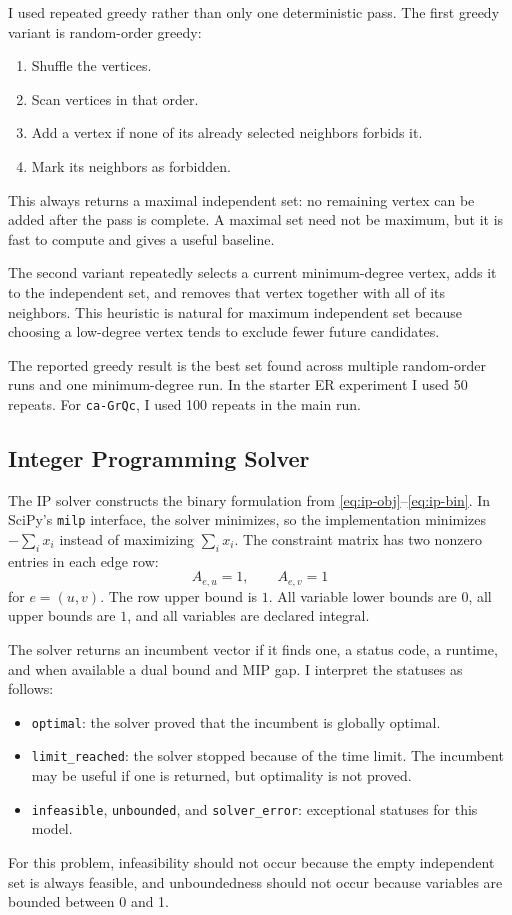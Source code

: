 \documentclass[11pt]{article}
\begin{document}
I used repeated greedy rather than only one deterministic pass. The first greedy
variant is random-order greedy:
\begin{enumerate}[leftmargin=*]
  \item Shuffle the vertices.
  \item Scan vertices in that order.
  \item Add a vertex if none of its already selected neighbors forbids it.
  \item Mark its neighbors as forbidden.
\end{enumerate}
This always returns a maximal independent set: no remaining vertex can be added
after the pass is complete. A maximal set need not be maximum, but it is fast to
compute and gives a useful baseline.

The second variant repeatedly selects a current minimum-degree vertex, adds it
to the independent set, and removes that vertex together with all of its
neighbors. This heuristic is natural for maximum independent set because choosing
a low-degree vertex tends to exclude fewer future candidates.

The reported greedy result is the best set found across multiple random-order
runs and one minimum-degree run. In the starter ER experiment I used 50 repeats.
For \texttt{ca-GrQc}, I used 100 repeats in the main run.

\subsection{Integer Programming Solver}

The IP solver constructs the binary formulation from
\eqref{eq:ip-obj}--\eqref{eq:ip-bin}. In SciPy's \texttt{milp} interface, the
solver minimizes, so the implementation minimizes $-\sum_i x_i$ instead of
maximizing $\sum_i x_i$. The constraint matrix has two nonzero entries in each
edge row:
\[
  A_{e,u}=1,\qquad A_{e,v}=1
\]
for $e=(u,v)$. The row upper bound is $1$. All variable lower bounds are $0$,
all upper bounds are $1$, and all variables are declared integral.

The solver returns an incumbent vector if it finds one, a status code, a runtime,
and when available a dual bound and MIP gap. I interpret the statuses as follows:
\begin{itemize}[leftmargin=*]
  \item \texttt{optimal}: the solver proved that the incumbent is globally
  optimal.
  \item \texttt{limit\_reached}: the solver stopped because of the time limit.
  The incumbent may be useful if one is returned, but optimality is not proved.
  \item \texttt{infeasible}, \texttt{unbounded}, and \texttt{solver\_error}:
  exceptional statuses for this model.
\end{itemize}
For this problem, infeasibility should not occur because the empty independent
set is always feasible, and unboundedness should not occur because variables are
bounded between 0 and 1.
\end{document}
